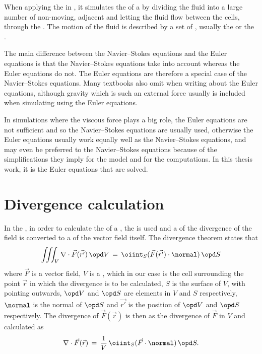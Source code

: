 When applying the \FVM in \CFD, it simulates the \flow of a \fluid by dividing the fluid into a large number of non-moving, adjacent \cells and letting the fluid flow between the cells, through the . The motion of the fluid is described by a set of \PDEs, usually the  or the .

The main difference between the Navier--Stokes equations and the Euler equations is that the Navier--Stokes equations take  into account whe\-reas the Euler equations do not. The Euler equations are therefore a special case of the Navier--Stokes equations. Many textbooks also omit  when writing about the Euler equations, although gravity which is such an external force usually is included when simulating  using the Euler equations.

In simulations where the viscous force plays a big role, the Euler equations are not sufficient and so the Navier--Stokes equations are usually used, otherwise the Euler equations usually work equally well as the Navier--Stokes equations, and may even be preferred to the Navier--Stokes equations because of the simplifications they imply for the model and for the computations. In this thesis work, it is the Euler equations that are solved.

\section{Divergence calculation}

In the \PDEs, in order to calculate the \divergence of a , the  is used and a  of the divergence of the field is converted to a  of the vector field itself. The divergence theorem states that
%
\begin{equation} \label{eq:divergence_theorem}
\iiint_V\nabla\cdot\vec{F}(\vec{r'})\,\opd V \,=\, \oiint_S(\vec{F}(\vec{r'})\cdot\normal)\,\opd S
\end{equation}
%
where $\vec{F}$ is a vector field, $V$ is a , which in our case is the cell surrounding the point $\vec{r}$ in which the divergence is to be calculated, $S$ is the surface of $V$, with  pointing outwards, $\opd V$ and $\opd S$ are \infinitesimal elements in $V$ and $S$ respectively, $\normal$ is the normal of $\opd S$ and $\vec{r'}$ is the position of $\opd V$ and $\opd S$ respectively. The divergence of $\vec{F}(\vec{r})$ is then \approximated as the \average divergence of $\vec{F}$ in $V$ and calculated as
%
\begin{equation} \label{eq:divergence_surface_integral}
\nabla\cdot\vec{F}(\vec{r}) \,=\, \frac{1}{V}\,\oiint_S(\vec{F}\cdot\normal)\,\opd S.
\end{equation}

